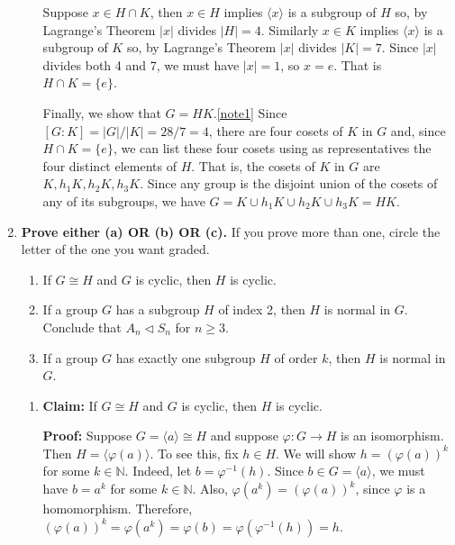 \documentclass[fleqn,12pt]{article}
\newcommand{\<}{\ensuremath{\langle}}
\renewcommand{\>}{\ensuremath{\rangle}}
\newcommand{\N}{\ensuremath{\mathbb{N}}}
\begin{document}
\begin{enumerate}[{\bf 1.}]
\begin{enumerate}
      \medskip
      Suppose $x \in H\cap K$, then $x \in H$ implies $\<x\>$ is a subgroup of $H$ so,
      by Lagrange's Theorem $|x|$ divides $|H| = 4$.
      Similarly $x \in K$ implies $\<x\>$ is a subgroup of $K$ so,
      by Lagrange's Theorem $|x|$ divides $|K| = 7$. Since $|x|$ divides both 4 and 7,
      we must have $|x| = 1$, so $x = e$.  That is $H\cap K = \{e\}$.

      \medskip
      Finally, we show that $G = HK$.\cref{note1}
      Since $[G : K] = |G|/|K| = 28/7 = 4$, there are four cosets of
      $K$ in $G$ and, since $H\cap K = \{e\}$, we can list these four cosets
      using as representatives the four distinct elements of $H$. That is,
      the cosets of $K$ in $G$ are $K, h_1K, h_2K, h_3K$.  Since any group is
      the disjoint union of the cosets of any of its subgroups, we have
      $G = K \cup h_1K \cup h_2K \cup h_3K = HK$.
  \end{enumerate}
\newpage
\item {\bf Prove either (a) OR (b) OR (c).} If you prove more than one, circle
  the letter of the one you want graded.

\begin{enumerate}
\item
If $G \cong H$ and $G$ is cyclic, then $H$ is cyclic.

\item If a group $G$ has a subgroup $H$ of index 2, then $H$ is
normal in $G$. \\
Conclude that $A_n \triangleleft S_n$ for $n \geq 3$.

\item 
If a group $G$ has exactly one subgroup $H$ of order $k$, then
$H$ is normal in $G$. 

\end{enumerate}

\medskip
{}
\begin{enumerate}
\item
{\bf Claim:} If $G \cong H$ and $G$ is cyclic, then $H$ is cyclic.

\medskip

{\bf Proof:}
 Suppose $G = \<a\> \cong H$ and suppose 
$\varphi: G \rightarrow H$ is an isomorphism.  Then 
$H = \<\varphi(a)\>$.  To see this, fix $h\in H$.  We will show 
$h = (\varphi(a))^k$ for some $k\in \N$. Indeed, let $b = \varphi^{-1}(h)$.
Since $b\in G = \<a\>$, we must have $b = a^k$ for some $k\in \N$.
Also, $\varphi(a^k) = (\varphi(a))^k$, since $\varphi$ is a homomorphism. 
Therefore, $(\varphi(a))^k = \varphi(a^k) = \varphi(b) = \varphi(\varphi^{-1}(h)) = h$.




\end{enumerate}
\end{enumerate}
\end{document}
